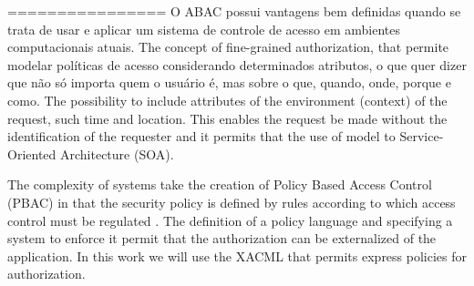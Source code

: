 ================
O ABAC possui vantagens bem definidas quando se trata de usar e aplicar um sistema de controle de acesso em ambientes computacionais atuais. The concept of fine-grained authorization, that permite modelar políticas de acesso considerando determinados atributos, o que quer dizer que não só importa quem o usuário é, mas sobre o que, quando, onde, porque e como. The possibility to include attributes of the environment (context) of the request, such time and location. This enables the request be made without the identification of the requester and it permits that the use of model to Service-Oriented Architecture (SOA).

The complexity of systems take the creation of Policy Based Access Control (PBAC) in that the security policy is defined by rules according to which access control must be regulated \citep{samarati2001access}. The definition of a policy language and specifying a system to enforce it permit that the authorization can be externalized of the application. In this work we will use the XACML that permits express policies for authorization.
